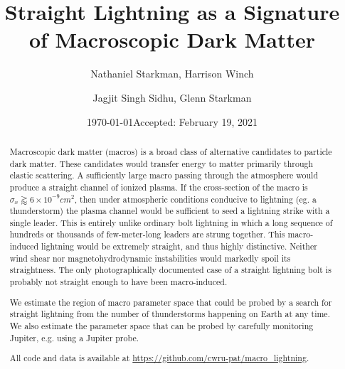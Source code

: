 \documentclass[%
 reprint,
 amsmath,amssymb,
 aps,
]{revtex4-2}
\begin{document}

\title{Straight Lightning as a Signature of Macroscopic Dark Matter}

\author{Nathaniel Starkman, Harrison Winch}%
%

\author{Jagjit Singh Sidhu, Glenn Starkman}

\date{\today \quad Accepted: February 19, 2021}


\begin{abstract}

    Macroscopic dark matter (macros) is a broad class of alternative candidates to particle dark matter. These candidates would transfer energy to matter primarily through elastic scattering. A sufficiently large macro passing through the atmosphere would produce a straight channel of ionized plasma. If the cross-section of the macro is $\sigma_x\gtrapprox6\times10^{-9}cm^2$, then under atmospheric conditions conducive to lightning (eg. a thunderstorm) the plasma channel would be sufficient to seed a lightning strike with a single leader. This is entirely unlike ordinary bolt lightning in which a long sequence of hundreds or thousands of few-meter-long leaders are strung together. This macro-induced lightning would be extremely straight, and thus highly distinctive. Neither wind shear nor magnetohydrodynamic instabilities would markedly spoil its straightness. The only photographically documented case of a straight lightning bolt is probably not straight enough to have been macro-induced.

    We estimate the region of macro parameter space that could be probed by a search for straight lightning from the number of thunderstorms happening on Earth at any time. We also estimate the parameter space that can be probed by carefully monitoring Jupiter, e.g. using a Jupiter probe.

    All code and data is available at \url{https://github.com/cwru-pat/macro_lightning}.

\end{abstract}
\end{document}
